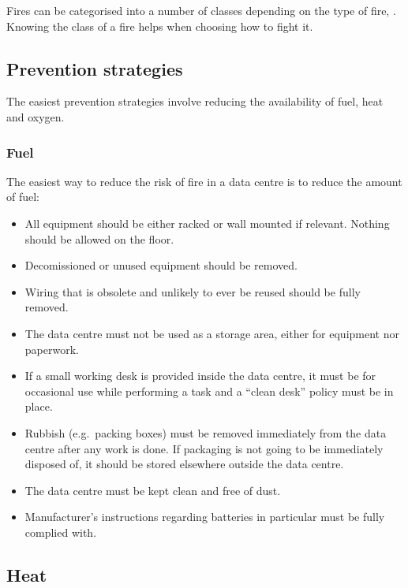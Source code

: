 \documentclass{pgnotes}
\begin{document}
Fires can be categorised into a number of classes depending on the type
of fire, . Knowing the class of a fire helps when choosing how to fight
it.


\subsection{Prevention strategies}
\label{sec:prevention-strategies}

The easiest prevention strategies involve reducing the availability of
fuel, heat and oxygen.

\subsubsection{Fuel}
\label{sec:fuel}

The easiest way to reduce the risk of fire in a data centre is to reduce
the amount of fuel:

\begin{itemize}
\item
  All equipment should be either racked or wall mounted if relevant.
  Nothing should be allowed on the floor.
\item
  Decomissioned or unused equipment should be removed.
\item
  Wiring that is obsolete and unlikely to ever be reused should be fully
  removed.
\item
  The data centre must not be used as a storage area, either for
  equipment nor paperwork.
\item
  If a small working desk is provided inside the data centre, it must be
  for occasional use while performing a task and a ``clean desk'' policy
  must be in place.
\item
  Rubbish (e.g.~packing boxes) must be removed immediately from the data
  centre after any work is done. If packaging is not going to be
  immediately disposed of, it should be stored elsewhere outside the
  data centre.
\item
  The data centre must be kept clean and free of dust.
\item
  Manufacturer's instructions regarding batteries in particular must be
  fully complied with.
\end{itemize}

\subsection{Heat}
\label{sec:heat}
\end{document}
